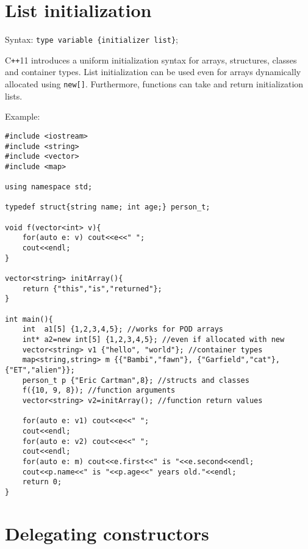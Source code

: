 \documentclass[12pt,a4paper]{article}
\begin{document}

\section{List initialization}

Syntax: \lstinline[language=none]|type variable {initializer list}|;

C\texttt{++}11 introduces a uniform initialization syntax for arrays, structures, classes and container types. List initialization can be used even for arrays dynamically allocated using \lstinline[style=CPP_CODE]|new[]|. Furthermore, functions can take and return initialization lists.

\clearpage

Example:
\vspace{10pt}
\lstset{style=CPP_CODE}
\begin{lstlisting}
#include <iostream>
#include <string>
#include <vector>
#include <map>

using namespace std;

typedef struct{string name; int age;} person_t;

void f(vector<int> v){
    for(auto e: v) cout<<e<<" ";
    cout<<endl;
}

vector<string> initArray(){
    return {"this","is","returned"};
}

int main(){
    int  a1[5] {1,2,3,4,5}; //works for POD arrays
    int* a2=new int[5] {1,2,3,4,5}; //even if allocated with new
    vector<string> v1 {"hello", "world"}; //container types
    map<string,string> m {{"Bambi","fawn"}, {"Garfield","cat"}, {"ET","alien"}};
    person_t p {"Eric Cartman",8}; //structs and classes
    f({10, 9, 8}); //function arguments
    vector<string> v2=initArray(); //function return values

    for(auto e: v1) cout<<e<<" ";
    cout<<endl;
    for(auto e: v2) cout<<e<<" ";
    cout<<endl;
    for(auto e: m) cout<<e.first<<" is "<<e.second<<endl;
    cout<<p.name<<" is "<<p.age<<" years old."<<endl;
    return 0;
}
\end{lstlisting}


\section{Delegating constructors}
\end{document}
